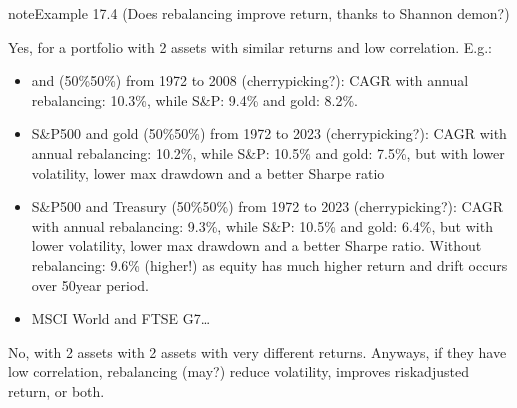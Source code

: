 \documentclass[letterpaper,10pt,english]{jupyterBook}
\begin{document}
\begin{sphinxadmonition}{note}{Example 17.4 (Does rebalancing improve return, thanks to Shannon demon?)}



\sphinxAtStartPar
Yes, for a portfolio with 2 assets with similar returns and low correlation.
E.g.:
\begin{itemize}
\item {} 
\sphinxAtStartPar
{} and  (50\%\sphinxhyphen{}50\%) from 1972 to 2008 (cherry\sphinxhyphen{}picking?): CAGR with annual rebalancing: 10.3\%, while S\&P: 9.4\% and gold: 8.2\%.

\item {} 
\sphinxAtStartPar
S\&P500 and gold (50\%\sphinxhyphen{}50\%) from 1972 to 2023 (cherry\sphinxhyphen{}picking?): CAGR with annual rebalancing: 10.2\%, while S\&P: 10.5\% and gold: 7.5\%, but with lower volatility, lower max drawdown and a better Sharpe ratio

\item {} 
\sphinxAtStartPar
S\&P500 and Treasury (50\%\sphinxhyphen{}50\%) from 1972 to 2023 (cherry\sphinxhyphen{}picking?): CAGR with annual rebalancing: 9.3\%, while S\&P: 10.5\% and gold: 6.4\%, but with lower volatility, lower max drawdown and a better Sharpe ratio. Without rebalancing: 9.6\% (higher!) as equity has much higher return and drift occurs over 50\sphinxhyphen{}year period.

\item {} 
\sphinxAtStartPar
MSCI World and FTSE G7…

\end{itemize}

\sphinxAtStartPar
No, with 2 assets with 2 assets with very different returns. Anyways, if they have low correlation, rebalancing (may?) reduce volatility, improves risk\sphinxhyphen{}adjusted return, or both.
\end{sphinxadmonition}
\end{document}
